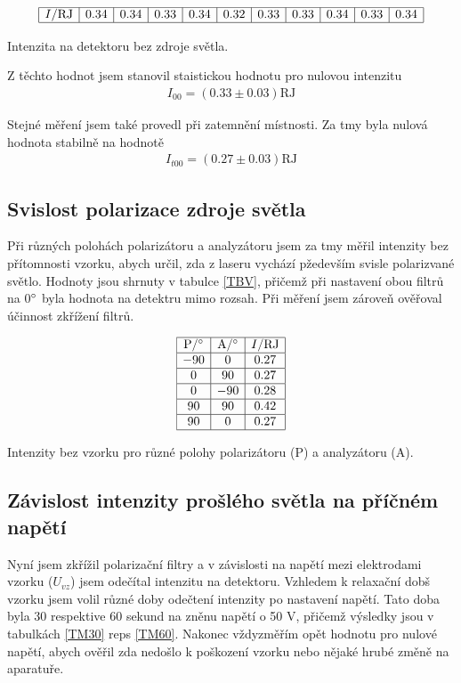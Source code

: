 \documentclass[a4paper,12pt]{article}
\begin{document}
\begin{table}
$$
\begin{array}{|c|c|c|c|c|c|c|c|c|c|c|}
\hline
I/\mbox{RJ}&   0.34&   0.34&   0.33&   0.34&   0.32&   0.33&   0.33&   0.34&   0.33&   0.34 \\ \hline
\end{array}
$$
\caption{Intenzita na detektoru bez zdroje světla.}
\label{I0a}
\end{table}

Z těchto hodnot jsem stanovil staistickou hodnotu pro nulovou intenzitu
\begin{eqnarray}
I_{00}=(0.33\pm0.03)\mbox{RJ}
\label{I00}
\end{eqnarray}

Stejné měření jsem také provedl při zatemnění místnosti. Za tmy byla nulová hodnota stabilně na hodnotě
\begin{eqnarray}
I_{t00}=(0.27\pm0.03)\mbox{RJ}
\label{It00}
\end{eqnarray}

\subsection{Svislost polarizace zdroje světla}
Při různých polohách polarizátoru a analyzátoru jsem za tmy měřil intenzity bez přítomnosti vzorku, abych určil, zda z laseru vychází pžedevším svisle polarizvané světlo. 
Hodnoty jsou shrnuty v tabulce \ref{TBV}, přičemž při nastavení obou filtrů na 0$^{\circ}$ byla hodnota na detektru mimo rozsah. Při měření jsem zároveň ověřoval účinnost 
zkřížení filtrů.

\begin{table}
$$
\begin{array}{|c|c|c|}
\hline
\mbox{P}/^{\circ}&   \mbox{A}/^{\circ}&   I/\mbox{RJ} \\ \hline
-90&    0&  0.27 \\ \hline
0&  90& 0.27 \\ \hline
0&  -90&    0.28 \\ \hline
90& 90& 0.42 \\ \hline
90& 0&  0.27 \\ \hline
\end{array}
$$
\caption{Intenzity bez vzorku pro různé polohy polarizátoru (P) a analyzátoru (A).}
\label{TBV}
\end{table}

\subsection{Závislost intenzity prošlého světla na příčném napětí}
Nyní jsem zkřížil polarizační filtry a v závislosti na napětí mezi elektrodami vzorku ($U_{vz}$) jsem odečítal intenzitu na detektoru. Vzhledem k relaxační dobš vzorku 
jsem volil různé doby odečtení intenzity po nastavení napětí. Tato doba byla 30 respektive 60 sekund na zněnu napětí o 50 V, přičemž výsledky jsou v tabulkách \ref{TM30} reps \ref{TM60}. Nakonec vždyzměřím opět hodnotu pro nulové napětí, abych ověřil zda nedošlo k poškození vzorku nebo nějaké hrubé změně na aparatuře.
\end{document}
